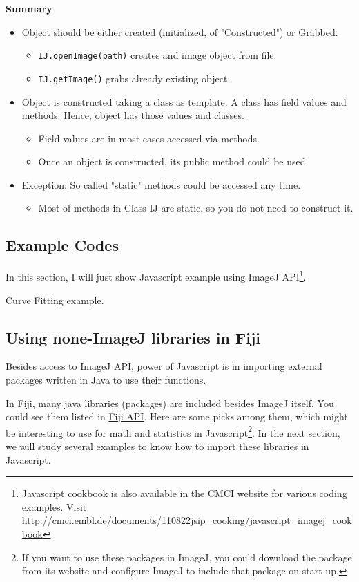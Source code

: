 \documentclass[11pt,a4paper,oneside]{report}
\newcommand{\ilcom}[1]{\texttt{\small#1}}
\begin{document}
\textbf{Summary}
\begin{itemize}
\item Object should be either created (initialized, of "Constructed") or Grabbed. 
\begin{itemize}
\item \ilcom{IJ.openImage(path)} creates and image object from file.
\item \ilcom{IJ.getImage()} grabs already existing object. 
\end{itemize}
\item Object is constructed taking a class as template. A class has field values and methods. 
Hence, object has those values and classes. 
\begin{itemize}
\item Field values are in most cases accessed via methods.
\item Once an object is constructed, its public method could be used
\end{itemize}
\item Exception: So called "static" methods could be accessed any time. 
\begin{itemize}
\item Most of methods in Class IJ are static, so you do not need to construct
it.
\end{itemize}
\end{itemize}

\subsection{Example Codes}

In this section, I will just show Javascript example using ImageJ
API\footnote{Javascript cookbook is also available in the CMCI website for
various coding examples. Visit
\url{http://cmci.embl.de/documents/110822jsip_cooking/javascript_imagej_cookbook}}.

Curve Fitting example. 



\subsection{Using none-ImageJ libraries in Fiji}

Besides access to ImageJ API, power of Javascript is in importing external packages 
written in Java to use their functions.

In Fiji, many java libraries (packages) are included besides ImageJ itself. 
You could see them listed in \href{http://fiji.sc/javadoc/}{Fiji API}. 
Here are some picks among them, which might be interesting to use for math and statistics 
in Javascript\footnote{ If you want to use these packages in ImageJ, 
you could download the package from its website and configure ImageJ 
to include that package on start up.}. In the next section, 
we will study several examples to know how to import these libraries in Javascript. 
\end{document}
